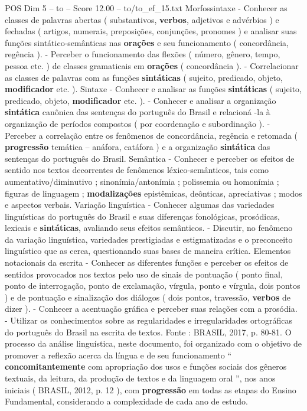 \begin{textsample}{POS Dim 5 – to – Score 12.00 – to/to\_ef\_15.txt}
Morfossintaxe - Conhecer as classes de palavras abertas ( substantivos, \textbf{verbos}, adjetivos e advérbios ) e fechadas ( artigos, numerais, preposições, conjunções, pronomes ) e analisar suas funções sintático-semânticas nas \textbf{orações} e seu funcionamento ( concordância, regência ). - Perceber o funcionamento das flexões ( número, gênero, tempo, pessoa etc. ) de classes gramaticais em \textbf{orações} ( concordância ). - Correlacionar as classes de palavras com as funções \textbf{sintáticas} ( sujeito, predicado, objeto, \textbf{modificador} etc. ).
Sintaxe - Conhecer e analisar as funções \textbf{sintáticas} ( sujeito, predicado, objeto, \textbf{modificador} etc. ). - Conhecer e analisar a organização \textbf{sintática} canônica das sentenças do português do Brasil e relacioná -la à organização de períodos compostos ( por coordenação e subordinação ). - Perceber a correlação entre os fenômenos de concordância, regência e retomada ( \textbf{progressão} temática – anáfora, catáfora ) e a organização \textbf{sintática} das sentenças do português do Brasil.
Semântica - Conhecer e perceber os efeitos de sentido nos textos decorrentes de fenômenos léxico-semânticos, tais como aumentativo/diminutivo ; sinonímia/antonímia ; polissemia ou homonímia ; figuras de linguagem ; \textbf{modalizações} epistêmicas, deônticas, apreciativas ; modos e aspectos verbais.
Variação linguística - Conhecer algumas das variedades linguísticas do português do Brasil e suas diferenças fonológicas, prosódicas, lexicais e \textbf{sintáticas}, avaliando seus efeitos semânticos. - Discutir, no fenômeno da variação linguística, variedades prestigiadas e estigmatizadas e o preconceito linguístico que as cerca, questionando suas bases de maneira crítica.
Elementos notacionais da escrita - Conhecer as diferentes funções e perceber os efeitos de sentidos provocados nos textos pelo uso de sinais de pontuação ( ponto final, ponto de interrogação, ponto de exclamação, vírgula, ponto e vírgula, dois pontos ) e de pontuação e sinalização dos diálogos ( dois pontos, travessão, \textbf{verbos} de dizer ). - Conhecer a acentuação gráfica e perceber suas relações com a prosódia. - Utilizar os conhecimentos sobre as regularidades e irregularidades ortográficas do português do Brasil na escrita de textos.
Fonte : BRASIL, 2017, p. 80-81.
O processo da análise linguística, neste documento, foi organizado com o objetivo de promover a reflexão acerca da língua e de seu funcionamento “ \textbf{concomitantemente} com apropriação dos usos e funções sociais dos gêneros textuais, da leitura, da produção de textos e da linguagem oral ”, nos anos iniciais ( BRASIL, 2012, p. 12 ), com \textbf{progressão} em todas as etapas do Ensino Fundamental, considerando a complexidade de cada ano de estudo.

\end{textsample}
